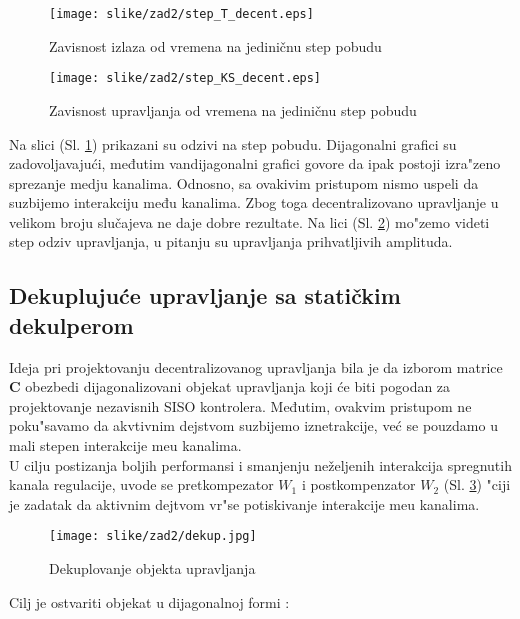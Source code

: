 \documentclass[a4paper,11pt]{article}
\theoremstyle{definition} \newtheorem{deff}{Definicija}[section]
\theoremstyle{definition} \newtheorem{prim}[deff]{Primer}
\theoremstyle{plain} \newtheorem{teor}[deff]{Teorema}
\begin{document}
	
	\clearpage
	\begin{figure}[!ht]
		\centering
		\texttt{[image: slike/zad2/step\_T\_decent.eps]}
		\caption{Zavisnost izlaza od vremena na jediničnu step pobudu}
		\label{fig:stepT_dec}
	\end{figure}
	
	\begin{figure}[!ht]
		\centering
		\texttt{[image: slike/zad2/step\_KS\_decent.eps]}
		\caption{Zavisnost upravljanja od vremena na jediničnu step pobudu}
		\label{fig:stepKS_dec}
	\end{figure}
	
	
	
	Na slici (Sl. \ref{fig:stepT_dec}) prikazani su odzivi na step pobudu. Dijagonalni grafici su zadovoljavajući, međutim vandijagonalni grafici govore da ipak postoji izra"zeno sprezanje medju kanalima. Odnosno, sa ovakivim pristupom nismo uspeli da suzbijemo interakciju među kanalima. Zbog toga decentralizovano upravljanje u velikom broju slučajeva ne daje dobre rezultate. Na lici (Sl. \ref{fig:stepKS_dec}) mo"zemo videti step odziv upravljanja, u pitanju su upravljanja prihvatljivih amplituda.
	
	\newpage
	\subsection{Dekuplujuće upravljanje sa statičkim dekulperom}
	
	Ideja pri projektovanju decentralizovanog upravljanja bila je da izborom matrice \textbf{C} obezbedi dijagonalizovani objekat upravljanja koji će biti pogodan za projektovanje nezavisnih SISO kontrolera. Međutim, ovakvim pristupom ne poku"savamo da akvtivnim dejstvom suzbijemo iznetrakcije, ve\'c se pouzdamo u mali stepen interakcije me\dj{}u kanalima. \\
	
	U cilju postizanja boljih performansi i smanjenju neželjenih interakcija spregnutih kanala regulacije, uvode se pretkompezator $W_1$ i postkompenzator $W_2$ (Sl. \ref{fig:dek}) "ciji je zadatak da aktivnim dejtvom vr"se potiskivanje interakcije me\dj{}u kanalima.
	
	
	\begin{figure}[!h]
		\centering
		\texttt{[image: slike/zad2/dekup.jpg]}
		\caption{Dekuplovanje objekta upravljanja}
		\label{fig:dek}
	\end{figure}
	
	
	Cilj je ostvariti objekat u dijagonalnoj formi : 
	
\end{document}
